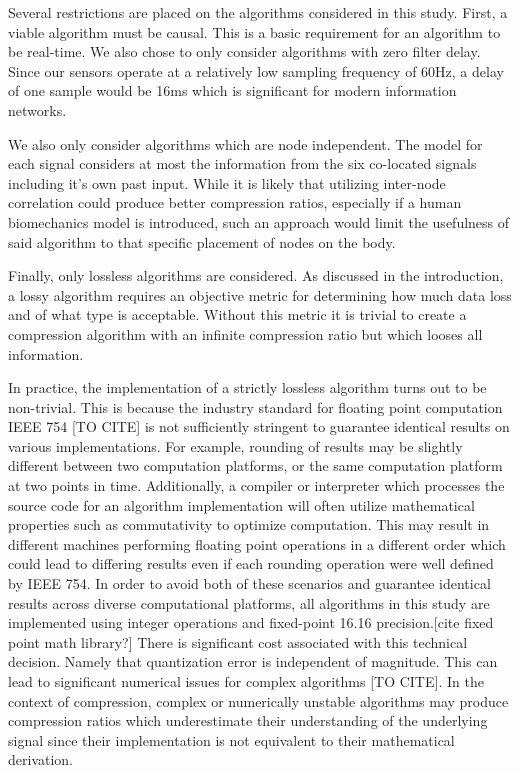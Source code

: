 \documentclass[journal]{IEEEtran}
\begin{document}
Several restrictions are placed on the algorithms considered in this study. First, a viable algorithm must be causal. This is a basic requirement for an algorithm to be real-time. We also chose to only consider algorithms with zero filter delay. Since our sensors operate at a relatively low sampling frequency of 60Hz, a delay of one sample would be 16ms which is significant for modern information networks.

We also only consider algorithms which are node independent. The model for each signal considers at most the information from the six co-located signals including it's own past input. While it is likely that utilizing inter-node correlation could produce better compression ratios, especially if a human biomechanics model is introduced, such an approach would limit the usefulness of said algorithm to that specific placement of nodes on the body.

Finally, only lossless algorithms are considered. As discussed in the introduction, a lossy algorithm requires an objective metric for determining how much data loss and of what type is acceptable. Without this metric it is trivial to create a compression algorithm with an infinite compression ratio but which looses all information.

In practice, the implementation of a strictly lossless algorithm turns out to be non-trivial. This is because the industry standard for floating point computation IEEE 754 [TO CITE] is not sufficiently stringent to guarantee identical results on various implementations. For example, rounding of results may be slightly different between two computation platforms, or the same computation platform at two points in time. Additionally, a compiler or interpreter which processes the source code for an algorithm implementation will often utilize mathematical properties such as commutativity to optimize computation. This may result in different machines performing floating point operations in a different order which could lead to differing results even if each rounding operation were well defined by IEEE 754. In order to avoid both of these scenarios and guarantee identical results across diverse computational platforms, all algorithms in this study are implemented using integer operations and fixed-point 16.16 precision.[cite fixed point math library?] There is significant cost associated with this technical decision. Namely that quantization error is independent of magnitude. This can lead to significant numerical issues for complex algorithms [TO CITE]. In the context of compression, complex or numerically unstable algorithms may produce compression ratios which underestimate their understanding of the underlying signal since their implementation is not equivalent to their mathematical derivation.
\end{document}
